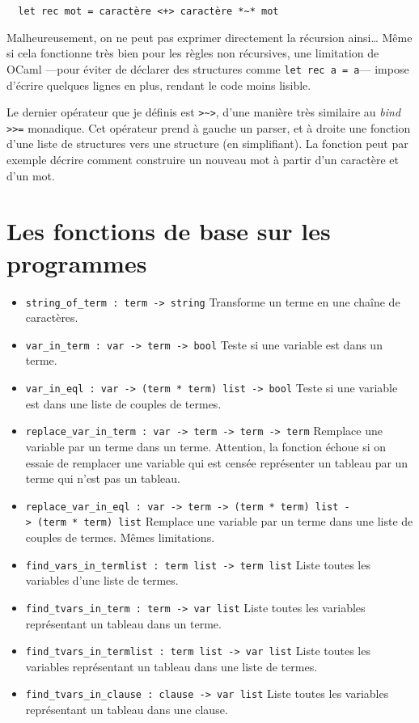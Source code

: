 \documentclass{article}
\begin{document}
\begin{verbatim}
  let rec mot = caractère <+> caractère *~* mot
\end{verbatim}

Malheureusement, on ne peut pas exprimer directement la récursion ainsi\ldots{} Même si cela fonctionne très bien pour les règles non récursives, une limitation de OCaml ---pour éviter de déclarer des structures comme \texttt{let\ rec\ a\ =\ a}--- impose d'écrire quelques lignes en plus, rendant le code moins lisible.

Le dernier opérateur que je définis est \texttt{>\textasciitilde{}>}, d'une manière très similaire au \emph{bind} \texttt{>>=} monadique. Cet opérateur prend à gauche un parser, et à droite une fonction d'une liste de structures vers une structure (en simplifiant). La fonction peut par exemple décrire comment construire un nouveau mot à partir d'un caractère et d'un mot.

\section{Les fonctions de base sur les programmes}

\begin{itemize}
  \item
    \texttt{string\_of\_term\ :\ term\ ->\ string} Transforme un terme en une chaîne de caractères.
  \item
    \texttt{var\_in\_term\ :\ var\ ->\ term\ ->\ bool} Teste si une variable est dans un terme.
  \item
    \texttt{var\_in\_eql\ :\ var\ ->\ (term\ *\ term)\ list\ ->\ bool} Teste si une variable est dans une liste de couples de termes.
  \item
    \texttt{replace\_var\_in\_term\ :\ var\ ->\ term\ ->\ term\ ->\ term} Remplace une variable par un terme dans un terme. Attention, la fonction échoue si on essaie de remplacer une variable qui est censée représenter un tableau par un terme qui n'est pas un tableau.
  \item
    \texttt{replace\_var\_in\_eql\ :\ var\ ->\ term\ ->\ (term\ *\ term)\ list\ ->\ (term\ *\ term)\ list} Remplace une variable par un terme dans une liste de couples de termes. Mêmes limitations.
  \item
    \texttt{find\_vars\_in\_termlist\ :\ term\ list\ ->\ term\ list} Liste toutes les variables d'une liste de termes.
  \item
    \texttt{find\_tvars\_in\_term\ :\ term\ ->\ var\ list} Liste toutes les variables représentant un tableau dans un terme.
  \item
    \texttt{find\_tvars\_in\_termlist\ :\ term\ list\ ->\ var\ list} Liste toutes les variables représentant un tableau dans une liste de termes.
  \item
    \texttt{find\_tvars\_in\_clause\ :\ clause\ ->\ var\ list} Liste toutes les variables représentant un tableau dans une clause.
\end{itemize}
\end{document}
